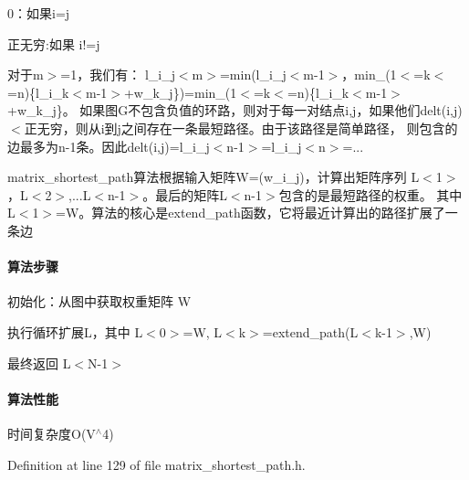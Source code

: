 \begin{DoxyItemize}
\item 0：如果i=j
\item 正无穷\+:如果 i!=j
\end{DoxyItemize}

对于m$>$=1，我们有： l\+\_\+i\+\_\+j$<$m$>$=min(l\+\_\+i\+\_\+j$<$m-\/1$>$，min\+\_\+(1$<$=k$<$=n)\{l\+\_\+i\+\_\+k$<$m-\/1$>$+w\+\_\+k\+\_\+j\})=min\+\_\+(1$<$=k$<$=n)\{l\+\_\+i\+\_\+k$<$m-\/1$>$+w\+\_\+k\+\_\+j\}。 如果图\+G不包含负值的环路，则对于每一对结点i,j，如果他们delt(i,j)$<$正无穷，则从i到j之间存在一条最短路径。由于该路径是简单路径， 则包含的边最多为n-\/1条。因此delt(i,j)=l\+\_\+i\+\_\+j$<$n-\/1$>$=l\+\_\+i\+\_\+j$<$n$>$=...

matrix\+\_\+shortest\+\_\+path算法根据输入矩阵\+W=(w\+\_\+i\+\_\+j)，计算出矩阵序列 L$<$1$>$，\+L$<$2$>$,...L$<$n-\/1$>$。最后的矩阵\+L$<$n-\/1$>$包含的是最短路径的权重。 其中\+L$<$1$>$=W。算法的核心是extend\+\_\+path函数，它将最近计算出的路径扩展了一条边

\paragraph*{算法步骤}


\begin{DoxyItemize}
\item 初始化：从图中获取权重矩阵 W
\item 执行循环扩展\+L，其中 L$<$0$>$=W, L$<$k$>$=extend\+\_\+path(L$<$k-\/1$>$,W)
\item 最终返回 L$<$N-\/1$>$
\end{DoxyItemize}

\paragraph*{算法性能}

时间复杂度\+O(\+V$^\wedge$4) 

Definition at line 129 of file matrix\+\_\+shortest\+\_\+path.\+h.

\hypertarget{namespace_introduction_to_algorithm_1_1_graph_algorithm_a6eb979447eeb937df4158f9646e20dde}{}
